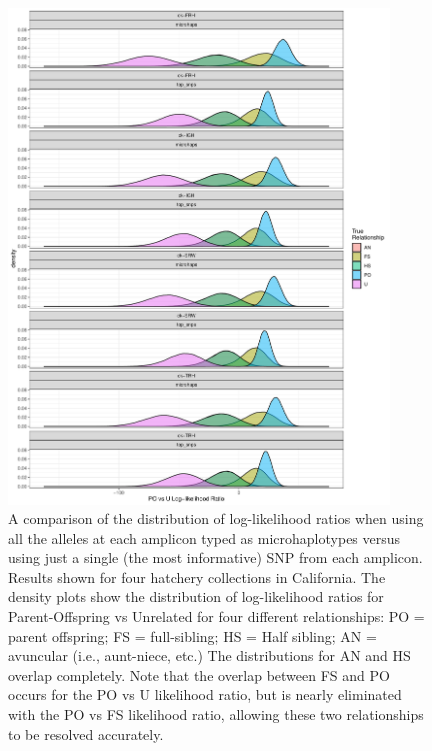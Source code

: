 \begin{figure}
\begin{center}
\includegraphics[width=0.9\textwidth]{images/cmkr-comp-figure-crop.pdf}
\end{center}
\caption[Comparison of microhaplotypes vs.~best SNP in each amplicon]{\footnotesize 
A comparison of the distribution of log-likelihood ratios when using all the alleles at each
amplicon typed as microhaplotypes versus using just a single (the most informative) SNP from each
amplicon.  Results shown for four hatchery collections in California.  The density plots show
the distribution of log-likelihood ratios for Parent-Offspring vs Unrelated for four different relationships:
PO = parent offspring; FS = full-sibling; HS = Half sibling; AN = avuncular (i.e., aunt-niece, etc.)
The distributions for AN and HS overlap completely.  Note that the overlap between FS and PO occurs
for the PO vs U likelihood ratio, but is nearly eliminated with the PO vs FS likelihood ratio, allowing these
two relationships to be resolved accurately.}
\label{fig:ckmr-comp}
\end{figure}

